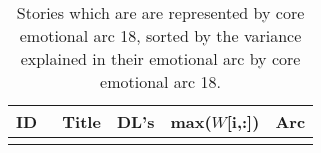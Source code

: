 \begin{longtable}{l | l | l | l | c}
ID & ~Title & DL's & max($W$[i,:]) & Arc\\
\hline
\endhead
\caption{Stories which are are represented by core emotional arc 18, sorted by the variance explained in their emotional arc by core emotional arc 18.}
\end{longtable}
